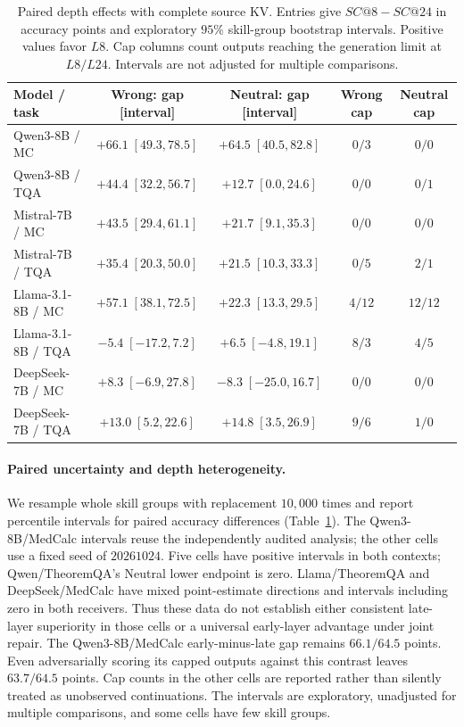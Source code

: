 \begin{table}[t]
\centering
\caption{Paired depth effects with complete source KV. Entries give
$SC@8-SC@24$ in accuracy points and exploratory $95\%$ skill-group
bootstrap intervals. Positive values favor $L8$. Cap columns count
outputs reaching the generation limit at $L8/L24$. Intervals are not
adjusted for multiple comparisons.}
\label{tab:state-depth-uncertainty}
\normalfont\rmfamily\fontsize{9}{11}\selectfont
\renewcommand{\arraystretch}{1.18}
\setlength{\tabcolsep}{2.5pt}
\setlength{\heavyrulewidth}{0.7pt}
\setlength{\lightrulewidth}{0.3pt}
\setlength{\aboverulesep}{2pt}
\setlength{\belowrulesep}{2.5pt}
\begin{tabularx}{\textwidth}{@{}Xcccc@{}}
\toprule
\rowcolor[HTML]{E4F4FA}
Model / task & Wrong: gap [interval] & Neutral: gap [interval] & Wrong cap & Neutral cap \\
\midrule
Qwen3-8B / MC & $+66.1\;[49.3,78.5]$ & $+64.5\;[40.5,82.8]$ & $0/3$ & $0/0$ \\
Qwen3-8B / TQA & $+44.4\;[32.2,56.7]$ & $+12.7\;[0.0,24.6]$ & $0/0$ & $0/1$ \\
Mistral-7B / MC & $+43.5\;[29.4,61.1]$ & $+21.7\;[9.1,35.3]$ & $0/0$ & $0/0$ \\
Mistral-7B / TQA & $+35.4\;[20.3,50.0]$ & $+21.5\;[10.3,33.3]$ & $0/5$ & $2/1$ \\
Llama-3.1-8B / MC & $+57.1\;[38.1,72.5]$ & $+22.3\;[13.3,29.5]$ & $4/12$ & $12/12$ \\
Llama-3.1-8B / TQA & $-5.4\;[-17.2,7.2]$ & $+6.5\;[-4.8,19.1]$ & $8/3$ & $4/5$ \\
DeepSeek-7B / MC & $+8.3\;[-6.9,27.8]$ & $-8.3\;[-25.0,16.7]$ & $0/0$ & $0/0$ \\
DeepSeek-7B / TQA & $+13.0\;[5.2,22.6]$ & $+14.8\;[3.5,26.9]$ & $9/6$ & $1/0$ \\
\bottomrule
\end{tabularx}
\end{table}

\paragraph{Paired uncertainty and depth heterogeneity.}
We resample whole skill groups with replacement $10{,}000$ times and
report percentile intervals for paired accuracy differences
(Table~\ref{tab:state-depth-uncertainty}). The Qwen3-8B/MedCalc intervals
reuse the independently audited analysis; the other cells use a fixed
seed of $20261024$. Five cells have positive intervals in both contexts;
Qwen/TheoremQA's Neutral lower endpoint is zero. Llama/TheoremQA and
DeepSeek/MedCalc have mixed point-estimate directions and intervals
including zero in both receivers. Thus these data do not establish either
consistent late-layer superiority in those cells or a universal early-layer
advantage under joint repair. The Qwen3-8B/MedCalc early-minus-late gap
remains $66.1/64.5$ points. Even adversarially scoring its capped outputs
against this contrast leaves $63.7/64.5$ points. Cap counts in the other
cells are reported rather than silently treated as unobserved continuations.
The intervals are exploratory, unadjusted for multiple comparisons, and
some cells have few skill groups.

